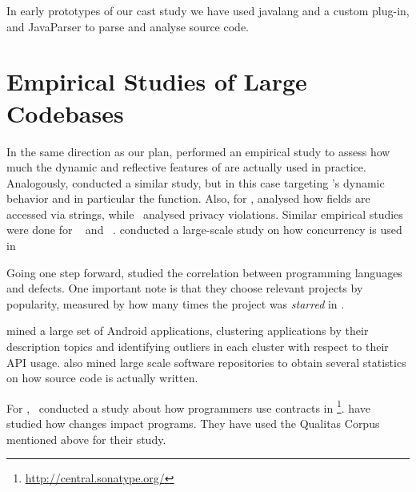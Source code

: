 In early prototypes of our cast study we have used
javalang and a custom \javac{} plug-in,%
and JavaParser%
to parse and analyse \java{} source code.


\section{Empirical Studies of Large Codebases}
\label{sec:literature-review:largescale}

In the same direction as our plan,
\cite{callauHowWhyDevelopers2013} performed an empirical study to assess
how much the dynamic and reflective features of \smalltalk{} are actually
used in practice.
Analogously, \cite{richardsAnalysisDynamicBehavior2010,richardsEvalThatMen2011,weiEmpiricalStudyDynamic2016}
conducted a similar study, but in this case targeting \javascript's dynamic
behavior and in particular the  function.
Also, for \javascript{}, \cite{madsenStringAnalysisDynamic2014} analysed
how fields are accessed via strings,
while~\cite{jangEmpiricalStudyPrivacyviolating2010}
analysed privacy violations.
Similar empirical studies were done for
\php{}~\citep{hillsEmpiricalStudyPHP2013,dahseExperienceReportEmpirical2015,doyleEmpiricalStudyEvolution2011}
and \swift{}~\citep{reboucasEmpiricalStudyUsage2016}.
\cite{PINTO201559} conducted a large-scale study on how concurrency is used in \java{}

Going one step forward, \cite{rayLargescaleStudyProgramming2017} studied the correlation between programming languages and defects. 
One important note is that they choose relevant projects by popularity,
measured by how many times the project was \emph{starred} in \github{}.

\cite{gorlaCheckingAppBehavior2014} mined a large set of Android applications, clustering applications by their description topics and identifying outliers in each cluster with respect to their API usage.
\cite{grechanikEmpiricalInvestigationLargescale2010} also mined large scale software repositories to obtain several statistics on how source code is actually written.

For \java{},~\cite{dietrichContractsWildStudy2017a} conducted a study
about how programmers use contracts in \mavencentral{}\footnote{\url{http://central.sonatype.org/}}.
\cite{dietrichBrokenPromisesEmpirical2014} have studied how
\api{} changes impact \java{} programs.
They have used the Qualitas Corpus~\citep{temperoQualitasCorpusCurated2010} mentioned above for their study.

